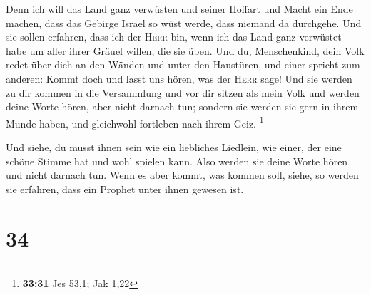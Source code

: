  Denn ich will das Land ganz verwüsten und seiner Hoffart
und Macht ein Ende machen, dass das Gebirge Israel so wüst werde, dass
niemand da durchgehe.  Und sie sollen erfahren, dass ich
der \textsc{Herr} bin, wenn ich das Land ganz verwüstet habe um aller
ihrer Gräuel willen, die sie üben.  Und du, Menschenkind,
dein Volk redet über dich an den Wänden und unter den Haustüren, und
einer spricht zum anderen: Kommt doch und lasst uns hören, was der
\textsc{Herr} sage!  Und sie werden zu dir kommen in die
Versammlung und vor dir sitzen als mein Volk und werden deine Worte
hören, aber nicht darnach tun; sondern sie werden sie gern in ihrem
Munde haben, und gleichwohl fortleben nach ihrem Geiz. \footnote{\textbf{33:31}
  Jes 53,1; Jak 1,22}

 Und siehe, du musst ihnen sein wie ein liebliches
Liedlein, wie einer, der eine schöne Stimme hat und wohl spielen kann.
Also werden sie deine Worte hören und nicht darnach tun. 
Wenn es aber kommt, was kommen soll, siehe, so werden sie erfahren, dass
ein Prophet unter ihnen gewesen ist.

\hypertarget{section-33}{%
\section{34}\label{section-33}}

